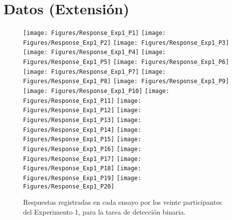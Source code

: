 
\chapter{Datos (Extensión)} %

\label{App_Data} %

\begin{figure}[th]
\centering
\texttt{[image: Figures/Response\_Exp1\_P1]} \texttt{[image: Figures/Response\_Exp1\_P2]} \texttt{[image: Figures/Response\_Exp1\_P3]}
\texttt{[image: Figures/Response\_Exp1\_P4]} \texttt{[image: Figures/Response\_Exp1\_P5]} \texttt{[image: Figures/Response\_Exp1\_P6]}
\texttt{[image: Figures/Response\_Exp1\_P7]} \texttt{[image: Figures/Response\_Exp1\_P8]} \texttt{[image: Figures/Response\_Exp1\_P9]}
\texttt{[image: Figures/Response\_Exp1\_P10]} \texttt{[image: Figures/Response\_Exp1\_P11]} \texttt{[image: Figures/Response\_Exp1\_P12]}
\texttt{[image: Figures/Response\_Exp1\_P13]} \texttt{[image: Figures/Response\_Exp1\_P14]} \texttt{[image: Figures/Response\_Exp1\_P15]}
\texttt{[image: Figures/Response\_Exp1\_P16]} \texttt{[image: Figures/Response\_Exp1\_P17]} \texttt{[image: Figures/Response\_Exp1\_P18]}
\texttt{[image: Figures/Response\_Exp1\_P19]} \texttt{[image: Figures/Response\_Exp1\_P20]} 
\caption[Respuesta binaria registrada ensayo a ensayo; Experimento 1]{Respuestas registradas en cada ensayo por los veinte participantes del Experimento 1, para la tarea de detección binaria.}
\label{fig:Response_E1}
\end{figure}

